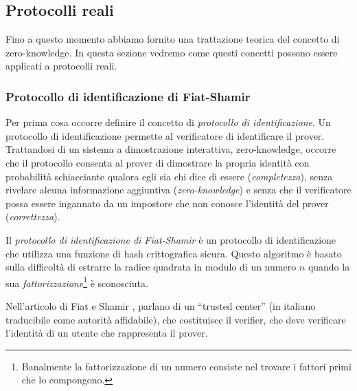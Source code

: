 \documentclass{article}
\theoremstyle{definition}
\begin{document}
\subsection{Protocolli reali}
Fino a questo momento abbiamo fornito una trattazione teorica del concetto di zero-knowledge. In questa sezione vedremo come questi concetti possono essere applicati a protocolli reali.

\subsubsection{Protocollo di identificazione di Fiat-Shamir}
Per prima cosa occorre definire il concetto di \emph{protocollo di identificazione}. Un protocollo di identificazione permette al verificatore di identificare il prover. 
Trattandosi di un sistema a dimostrazione interattiva, zero-knowledge, occorre che il protocollo consenta al prover di dimostrare la propria identità con probabilità schiacciante qualora egli sia chi dice di essere (\emph{completezza}), senza rivelare alcuna informazione aggiuntiva (\emph{zero-knowledge}) e senza che il verificatore possa essere ingannato da un impostore che non conosce l'identità del prover (\emph{correttezza}).

Il \emph{protocollo di identificazione di Fiat-Shamir} è un protocollo di identificazione che utilizza una funzione di hash crittografica sicura. Questo algoritmo è basato sulla difficoltà di estrarre la radice quadrata in modulo di un numero $n$ quando la sua \emph{fattorizzazione}\footnote{Banalmente la fattorizzazione di un numero consiste nel trovare i fattori primi che lo compongono.} è sconosciuta.

Nell'articolo di Fiat e Shamir \cite{identification}, parlano di un ``trusted center'' (in italiano traducibile come autorità affidabile), che costituisce il verifier, che deve verificare l'identità di un utente che rappresenta il prover.
\end{document}
